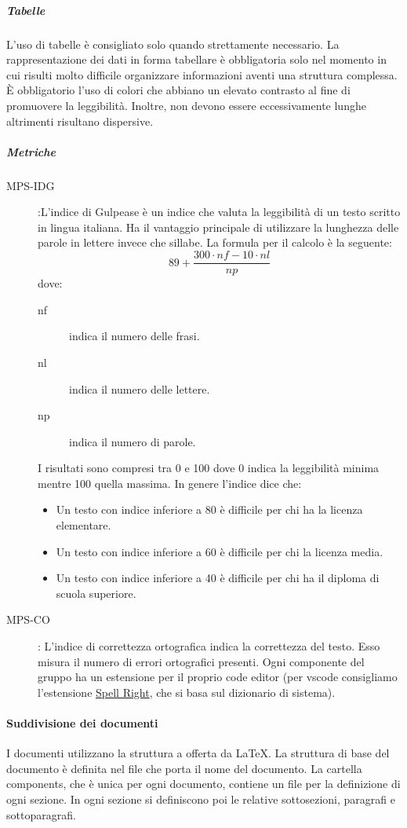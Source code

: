 \documentclass[../../norme-di-progetto.tex]{subfiles}
\begin{document}
\subparagraph{Tabelle}%
\label{subp:tabelle}
L'uso di tabelle è consigliato solo quando strettamente necessario. La rappresentazione dei dati in forma tabellare è obbligatoria solo nel momento in cui risulti molto difficile organizzare informazioni aventi una struttura complessa. È obbligatorio l'uso di colori che abbiano un elevato contrasto al fine di promuovere la leggibilità. Inoltre, non devono essere eccessivamente lunghe altrimenti risultano dispersive.

\subparagraph{Metriche}%
\label{subp:metriche}

\begin{description}
  \item [MPS-IDG]:L'indice di Gulpease è un indice che valuta la leggibilità di un testo scritto in lingua italiana. Ha il vantaggio principale di utilizzare la lunghezza delle parole in lettere invece che sillabe. La formula per il calcolo è la seguente:
  \[
    89 +\frac{300\cdot nf-10\cdot nl}{np}
  \]
  dove:
  \begin{description}
    \item [nf] indica il numero delle frasi.
    \item [nl] indica il numero delle lettere.
    \item [np] indica il numero di parole.
  \end{description}
  I risultati sono compresi tra 0 e 100 dove 0 indica la leggibilità minima mentre 100 quella massima. In genere l'indice dice che:
  \begin{itemize}
    \item Un testo con indice inferiore a 80 è difficile per chi ha la licenza elementare.
    \item Un testo con indice inferiore a 60 è difficile per chi la licenza media.
    \item Un testo con indice inferiore a 40 è difficile per chi ha il diploma di scuola superiore.
  \end{itemize}
  \item [MPS-CO]: L'indice di correttezza ortografica indica la correttezza del testo.
  Esso misura il numero di errori ortografici presenti.
  Ogni componente del gruppo ha un estensione per il proprio code editor (per vscode consigliamo l'estensione \href{https://marketplace.visualstudio.com/items?itemName=ban.spellright}{Spell Right}, che si basa sul dizionario di sistema).
\end{description}

\paragraph{Suddivisione dei documenti}%
\label{par:suddivisione_dei_documenti}
I documenti utilizzano la struttura a  offerta da \LaTeX.
La struttura di base del documento è definita nel file che porta il nome del documento.
La cartella components, che è unica per ogni documento, contiene un file per la definizione di ogni sezione. In ogni sezione si definiscono poi le relative sottosezioni, paragrafi e sottoparagrafi.
\end{document}
